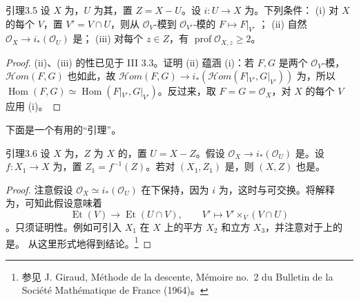 \begin{SGAresult}{引理}{3.5}
设 $X$ 为，$U$ 为其，置 $Z=X-U$。设 $i:U\to X$ 为。下列条件：
(i) 对 $X$ 的每个 $V$，置 $V'=V\cap U$，则从 $\mathcal O_V$-模到 $\mathcal O_{V'}$-模的 $F\mapsto F|_{V'}$ ；
(ii) 自然 $\mathcal O_X\to i_*(\mathcal O_U)$ 是；
(iii) 对每个 $z\in Z$，有 $\operatorname{prof}\mathcal O_{X,z}\geq2$。
\end{SGAresult}
\begin{proof}
(ii)、(iii) 的性已见于 III 3.3。证明 (ii) 蕴涵 (i)：若 $F,G$ 是两个 $\mathcal O_V$-模，$\mathcal Hom(F,G)$ 也如此，故 $\mathcal Hom(F,G)\to i_*(\mathcal Hom(F|_{V'},G|_{V'}))$ 为，所以 $\operatorname{Hom}(F,G)\simeq\operatorname{Hom}(F|_{V'},G|_{V'})$。反过来，取 $F=G=\mathcal O_X$，对 $X$ 的每个 $V$ 应用 (i)。
\end{proof}
下面是一个有用的“引理”。
\begin{SGAresult}{引理}{3.6}
设 $X$ 为，$Z$ 为 $X$ 的，置 $U=X-Z$。假设 $\mathcal O_X\to i_*(\mathcal O_U)$ 是。设 $f:X_1\to X$ 为，置 $Z_1=f^{-1}(Z)$。若对 $(X_1,Z_1)$ 是，则 $(X,Z)$ 也是。
\end{SGAresult}
\begin{proof}
注意假设 $\mathcal O_X\simeq i_*(\mathcal O_U)$ 在下保持，因为 $i$ 为，这时与可交换。将解释为，可知此假设意味着
\[\operatorname{Et}(V)\longrightarrow\operatorname{Et}(U\cap V),\qquad V'\longmapsto V'\times_V(V\cap U)\]
。只须证明性。例如可引入 $X_1$ 在 $X$ 上的平方 $X_2$ 和立方 $X_3$，并注意对于上的是。
从这里形式地得到结论。\footnote{参见 J. Giraud, Méthode de la descente, Mémoire no.~2 du Bulletin de la Société Mathématique de France (1964)。}
\end{proof}
